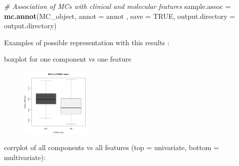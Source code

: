 \documentclass[]{article}
\newenvironment{Shaded}{\begin{snugshade}}{\end{snugshade}}
\newcommand{\KeywordTok}[1]{\textcolor[rgb]{0.13,0.29,0.53}{\textbf{#1}}}
\newcommand{\DataTypeTok}[1]{\textcolor[rgb]{0.13,0.29,0.53}{#1}}
\newcommand{\StringTok}[1]{\textcolor[rgb]{0.31,0.60,0.02}{#1}}
\newcommand{\CommentTok}[1]{\textcolor[rgb]{0.56,0.35,0.01}{\textit{#1}}}
\newcommand{\OtherTok}[1]{\textcolor[rgb]{0.56,0.35,0.01}{#1}}
\newcommand{\OperatorTok}[1]{\textcolor[rgb]{0.81,0.36,0.00}{\textbf{#1}}}
\newcommand{\NormalTok}[1]{#1}
\begin{document}
\begin{Shaded}
\begin{Highlighting}[]
\CommentTok{# Association of MCs with clinical and molecular features}
\NormalTok{sample.assoc =}\StringTok{ }\KeywordTok{mc.annot}\NormalTok{(MC_object, }\DataTypeTok{annot =}\NormalTok{ annot , }\DataTypeTok{save =} \OtherTok{TRUE}\NormalTok{, }\DataTypeTok{output.directory =}\NormalTok{ output.directory)}
\end{Highlighting}
\end{Shaded}

Examples of possible representation with this results :

boxplot for one component vs one feature

\begin{Shaded}
\end{Shaded}

\begin{figure}
\centering
\includegraphics[width=0.30000\textwidth,height=0.30000\textwidth]{./MC9_vs_annot.png}
\caption{}
\end{figure}

corrplot of all components vs all features (top = univariate, bottom =
multivariate):

\begin{Shaded}
\end{Shaded}
\end{document}
